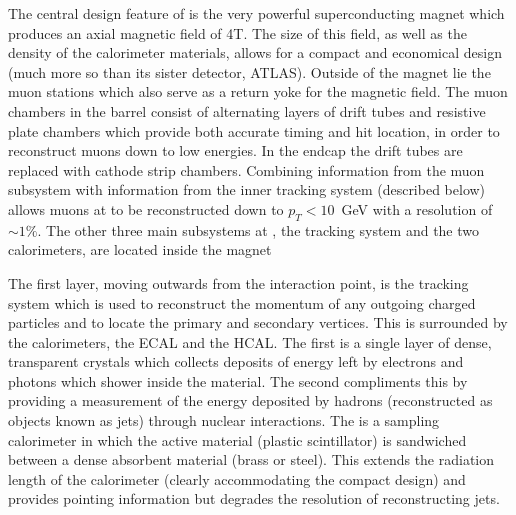 The central design feature of \CMS is the very powerful superconducting magnet which produces an axial magnetic field of 4T. The size of this field, as well as the density of the calorimeter materials, allows for a compact and economical design (much more so than its sister detector, ATLAS). Outside of the magnet lie the muon stations which also serve as a return yoke for the magnetic field. The muon chambers in the barrel consist of alternating layers of drift tubes and resistive plate chambers which provide both accurate timing and hit location, in order to reconstruct muons down to low energies. In the endcap the drift tubes are replaced with cathode strip chambers. Combining information from the muon subsystem with information from the inner tracking system (described below) allows muons at \CMS to be reconstructed down to $p_{T}<10$~GeV with a resolution of $\sim1\%$. The other three main subsystems at \CMS, the tracking system and the two calorimeters, are located inside the magnet

The first layer, moving outwards from the interaction point, is the tracking system which is used to reconstruct the momentum of any outgoing charged particles and to locate the primary and secondary vertices. This is surrounded by the calorimeters, the \acf{ECAL} and the \acf{HCAL}. The first is a single layer of dense, transparent crystals which collects deposits of energy left by electrons and photons which shower inside the material. The second compliments this by providing a measurement of the energy deposited by hadrons (reconstructed as objects known as jets) through nuclear interactions. The \HCAL is a sampling calorimeter in which the active material (plastic scintillator) is sandwiched between a dense absorbent material (brass or steel). This extends the radiation length of the calorimeter (clearly accommodating the compact design) and provides pointing information but degrades the resolution of reconstructing jets. 

